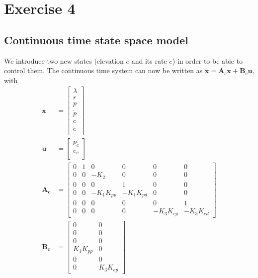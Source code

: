 
\section{Exercise 4}
\subsection{Continuous time state space model}
We introduce two new states (elevation $e$ and its rate $\dot{e}$) in order to be able to control them. The continuous time system can now be written as $\mathbf{\dot{x}} = \mathbf{A}_c\mathbf{x}+ \mathbf{B}_c \mathbf{u}$, with
\begin{subequations}
    \begin{align}
        \mathbf{x} &= \begin{bmatrix}
            \lambda\\
            r\\
            p\\
            \dot{p}\\
            e\\
            \dot{e}\\
        \end{bmatrix}\\
        \mathbf{u} &= \begin{bmatrix}
            p_c\\
            e_c\\
        \end{bmatrix}\\
    \mathbf{A_c} &= \begin{bmatrix}
        0 & 1 & 0          & 0          & 0          & 0         \\
        0 & 0 & -K_2       & 0          & 0          & 0         \\
        0 & 0 & 0          & 1          & 0          & 0         \\
        0 & 0 & -K_1K_{pp} & -K_1K_{pd} & 0          & 0         \\
        0 & 0 & 0          & 0          & 0          & 1         \\
        0 & 0 & 0          & 0          & -K_3K_{ep} & -K_3K_{ed}
    \end{bmatrix}\\
    \mathbf{B_c} &= \begin{bmatrix}
        0         & 0        \\
        0         & 0        \\
        0         & 0        \\
        K_1K_{pp} & 0        \\
        0         & 0        \\
        0         & K_3K_{ep}
    \end{bmatrix}
    \end{align}
\end{subequations}
